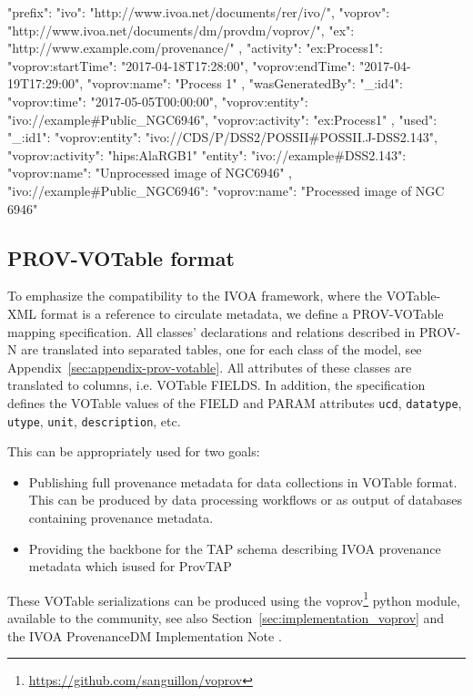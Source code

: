 
\begin{verbnobox}[\scriptsize]
{
  "prefix": {
    "ivo": "http://www.ivoa.net/documents/rer/ivo/",
    "voprov": "http://www.ivoa.net/documents/dm/provdm/voprov/",
    "ex": "http://www.example.com/provenance/"
  },
  "activity": {
    "ex:Process1": {
      "voprov:startTime": "2017-04-18T17:28:00",
      "voprov:endTime": "2017-04-19T17:29:00",
      "voprov:name": "Process 1"
    }
  },
  "wasGeneratedBy": {
    "_:id4": {
      "voprov:time": "2017-05-05T00:00:00",
      "voprov:entity": "ivo://example#Public_NGC6946",
      "voprov:activity": "ex:Process1"
    }
  },
  "used": {
    "_:id1": {
      "voprov:entity": "ivo://CDS/P/DSS2/POSSII#POSSII.J-DSS2.143",
      "voprov:activity": "hips:AlaRGB1"
    }
  }
  "entity": {
    "ivo://example#DSS2.143": {
      "voprov:name": "Unprocessed image of NGC6946"
    },
    "ivo://example#Public_NGC6946": {
      "voprov:name": "Processed image of NGC 6946"
    }
  }
}
\end{verbnobox}

\subsection{PROV-VOTable format} 
To emphasize the compatibility to the IVOA framework, where the VOTable-XML
format is a reference to circulate metadata, we define a PROV-VOTable mapping
specification. All classes' declarations and relations described in PROV-N are
translated into separated tables, one for each class of the model, see
Appendix~\ref{sec:appendix-prov-votable}. All attributes of these classes are
translated to columns, i.e. VOTable FIELDS. In addition, the specification
defines the VOTable values of the FIELD and PARAM attributes \texttt{ucd},
\texttt{datatype}, \texttt{utype}, \texttt{unit}, \texttt{description}, etc. 

This can be appropriately used for two goals:
\begin{itemize}
	\item Publishing full provenance metadata for data collections in VOTable format. This can be produced by data processing workflows or as output of databases containing provenance metadata.
	\item Providing the backbone for the TAP schema describing IVOA provenance metadata which isused for ProvTAP 
\end{itemize}

These VOTable serializations can be produced using the voprov\footnote{\url{https://github.com/sanguillon/voprov}} python module, available to the community, see also Section~\ref{sec:implementation_voprov} and the IVOA ProvenanceDM Implementation Note \citep[]{std:ProvenanceImplementationNote}. 

